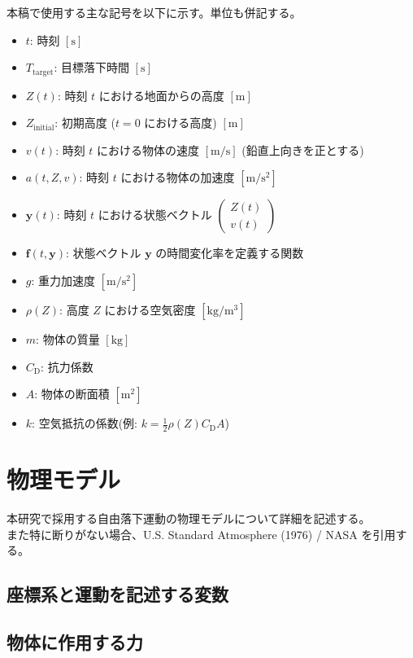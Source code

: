 \documentclass[a4paper,12pt]{article}
\begin{document}
本稿で使用する主な記号を以下に示す。単位も併記する。
\begin{itemize}
    \item $t$: 時刻 $[\mathrm{s}]$
    \item $T_{\mathrm{target}}$: 目標落下時間 $[\mathrm{s}]$
    \item $Z(t)$: 時刻 $t$ における地面からの高度 $[\mathrm{m}]$
    \item $Z_{\mathrm{initial}}$: 初期高度 ($t=0$ における高度) $[\mathrm{m}]$
    \item $v(t)$: 時刻 $t$ における物体の速度 $[\mathrm{m/s}]$ (鉛直上向きを正とする)
    \item $a(t, Z, v)$: 時刻 $t$ における物体の加速度 $[\mathrm{m/s^2}]$
    \item $\bm{y}(t)$: 時刻 $t$ における状態ベクトル $\begin{pmatrix} Z(t) \\ v(t) \end{pmatrix}$
    \item $\bm{f}(t, \bm{y})$: 状態ベクトル $\bm{y}$ の時間変化率を定義する関数
    \item $g$: 重力加速度 $[\mathrm{m/s^2}]$
    \item $\rho(Z)$: 高度 $Z$ における空気密度 $[\mathrm{kg/m^3}]$
    \item $m$: 物体の質量 $[\mathrm{kg}]$
    \item $C_{\mathrm{D}}$: 抗力係数
    \item $A$: 物体の断面積 $[\mathrm{m^2}]$
    \item $k$: 空気抵抗の係数(例: $k = \frac{1}{2} \rho(Z) C_{\mathrm{D}} A$)
\end{itemize}

\section{物理モデル}
\label{sec:physics_model}

本研究で採用する自由落下運動の物理モデルについて詳細を記述する。\\
また特に断りがない場合、U.S. Standard Atmosphere (1976) / NASA を引用する。
\subsection*{座標系と運動を記述する変数}

\subsection*{物体に作用する力}
\end{document}
